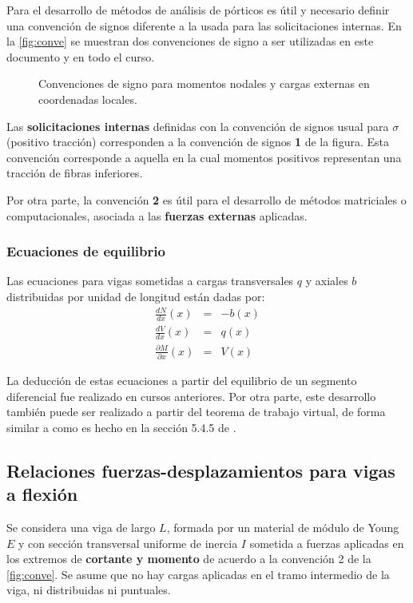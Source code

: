 Para el desarrollo de métodos de análisis de pórticos es útil y necesario definir una convención de signos diferente a la usada para las solicitaciones internas. %
%
En la \autoref{fig:conve} se muestran dos convenciones de signo a ser utilizadas en este documento y en todo el curso.
%
\begin{figure}[htb]
  \centering
  \def\svgwidth{0.8\textwidth}
  
	\caption{Convenciones de signo para momentos nodales y cargas externas en coordenadas locales.}
	\label{fig:conve}
\end{figure}

Las \textbf{solicitaciones internas} definidas con la convención de signos usual para $\sigma$ (positivo tracción) corresponden a la convención de signos \textbf{1} de la figura. %
%
Esta convención corresponde a aquella en la cual momentos positivos representan una tracción de fibras inferiores.

Por otra parte, la convención \textbf{2} es útil para el desarrollo de métodos matriciales o computacionales, asociada a las \textbf{fuerzas externas} aplicadas.

\subsubsection{Ecuaciones de equilibrio}

Las ecuaciones para vigas sometidas a cargas transversales $q$ y axiales $b$ distribuidas por unidad de longitud están dadas por:
%
\begin{eqnarray}
\frac{dN}{dx}(x) & =& -b(x) \\
\frac{dV}{dx}(x) & =& q(x) \label{eqn:eqcortante}\\
\frac{\partial M}{\partial x}(x) & =& V(x)
\end{eqnarray}
%

La deducción de estas ecuaciones a partir del equilibrio de un segmento diferencial fue realizado en cursos anteriores. %
Por otra parte, este desarrollo también puede ser realizado a partir del teorema de trabajo virtual, de forma similar a como es hecho en la sección 5.4.5 de \citep{Hughes1987a}.


\subsection{Relaciones fuerzas-desplazamientos para vigas a flexión}\label{sec:mdvig}

Se considera una viga de largo $L$, formada por un material de módulo de Young $E$ y con sección transversal uniforme de inercia $I$ sometida a fuerzas aplicadas en los extremos de \textbf{cortante y momento} de acuerdo a la convención 2 de la \autoref{fig:conve}. %
%
Se asume que no hay cargas aplicadas en el tramo intermedio de la viga, ni distribuidas ni puntuales. %
%

